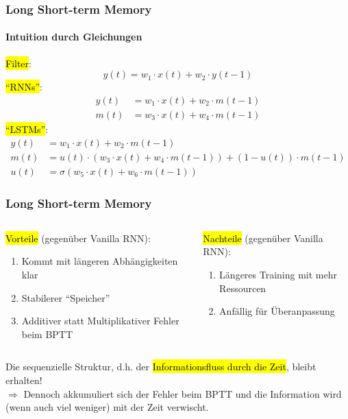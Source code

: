 \documentclass[german,aspectratio=169]{beamer}
\begin{document}
\begin{frame}
	\frametitle{Long Short-term Memory}
	\framesubtitle{Intuition durch Gleichungen}
	\hl{Filter}:
	\begin{equation*}
		y(t) = w_1 \cdot x(t) + w_2 \cdot y(t-1)
	\end{equation*}
	\hl{``RNNs''}:
	\begin{equation*}
		\begin{split}
			y(t) &= w_1 \cdot x(t) + w_2 \cdot m(t-1)\\
			m(t) &= w_3 \cdot x(t) + w_4 \cdot m(t-1)
		\end{split}
	\end{equation*}
		\hl{``LSTMs''}:
	\begin{equation*}
		\begin{split}
			y(t) &= w_1 \cdot x(t) + w_2 \cdot m(t-1)\\
			m(t) &= u(t) \cdot  \left(w_3 \cdot x(t) + w_4 \cdot m(t-1)\right) + (1-u(t)) \cdot m(t-1)\\
			u(t) &= \sigma(w_5 \cdot x(t) + w_6 \cdot m(t-1))
		\end{split}
	\end{equation*}
\end{frame}

\begin{frame}
	\frametitle{Long Short-term Memory}
	\begin{columns}
		\begin{column}{0.5\textwidth}
			\hl{Vorteile} (gegenüber Vanilla RNN):
			\begin{enumerate}[label={\color{mygreen}\textbf{+}}]
				\item Kommt mit längeren Abhängigkeiten klar
				\item Stabilerer ``Speicher''
				\item Additiver statt Multiplikativer Fehler beim BPTT
			\end{enumerate}
		\end{column}
		\hfill
		\begin{column}{0.5\textwidth}
			\hl{Nachteile} (gegenüber Vanilla RNN):
			\begin{enumerate}[label={\color{myred}\textbf{-}}]
				\item Längeres Training mit mehr Ressourcen
				\item Anfällig für Überanpassung
			\end{enumerate}
		\end{column}
	\end{columns}
	\vspace{1.0cm}
	Die sequenzielle Struktur, d.h. der \hl{Informationsfluss durch die Zeit}, bleibt erhalten!\\
	\vspace{0.5cm}
	$\Rightarrow$ Dennoch akkumuliert sich der Fehler beim BPTT und die Information wird (wenn auch viel weniger) mit der Zeit verwischt.
\end{frame}
\end{document}
